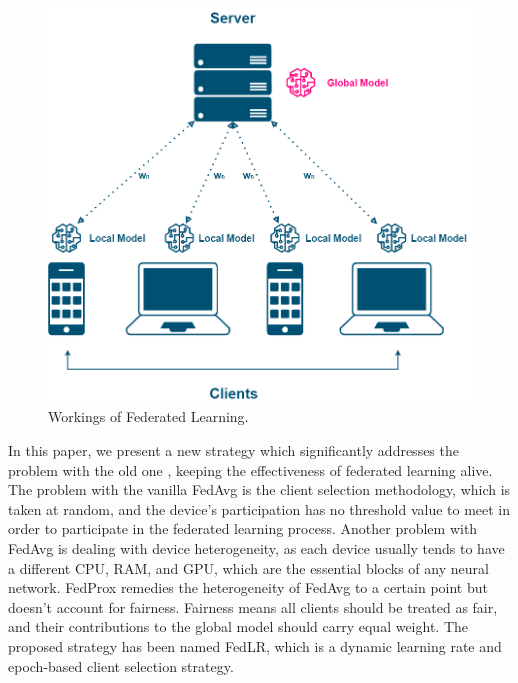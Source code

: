 \documentclass[conference]{IEEEtran}
\begin{document}
\begin{figure}[htp!]
	\centering
	\includegraphics[scale=.25]{Images/FEDLEARN_NEW}
	\caption{Workings of Federated Learning.}
	\label{fig1}
\end{figure}

 In this paper, we present a new strategy which significantly addresses the problem with the old one \cite{mcmahan2017communication}, keeping the effectiveness of federated learning alive. The problem with the vanilla FedAvg is the client selection methodology, which is taken at random, and the device's participation has no threshold value to meet in order to participate in the federated learning process. Another problem with FedAvg is dealing with device heterogeneity, as each device usually tends to have a different CPU, RAM, and GPU, which are the essential blocks of any neural network. FedProx \cite{li2020federated} remedies the heterogeneity of FedAvg to a certain point but doesn't account for fairness. Fairness means all clients should be treated as fair, and their contributions to the global model should carry equal weight. The proposed strategy has been named FedLR, which is a dynamic learning rate and epoch-based client selection strategy.
 
\end{document}
